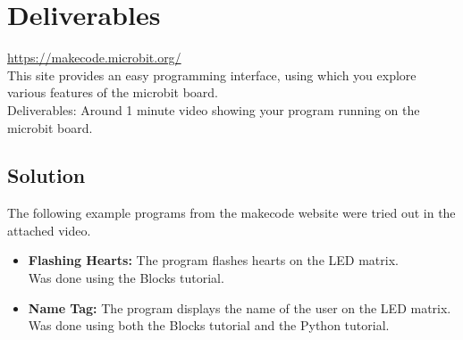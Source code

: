 \section*{Deliverables}

\url{https://makecode.microbit.org/} \\
This site provides an easy programming interface, using which you explore various features of the microbit board.\\
Deliverables: Around 1 minute video showing your program running on the microbit board.

\subsection*{Solution}

The following example programs from the makecode website were tried out in the attached video.
\begin{itemize}
    \item \textbf{Flashing Hearts:} The program flashes hearts on the LED matrix.\\
          Was done using the Blocks tutorial.
    \item \textbf{Name Tag:} The program displays the name of the user on the LED matrix.\\
          Was done using both the Blocks tutorial and the Python tutorial.
\end{itemize}
